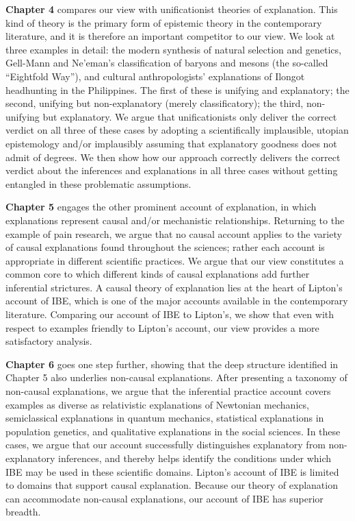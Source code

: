 \documentclass{article}[11pt]
\begin{document}
\textbf{Chapter 4} compares our view with unificationist theories of explanation.  This kind of theory is the primary form of epistemic theory in the contemporary literature, and it is therefore an important competitor to our view.  We look at three examples in detail: the modern synthesis of natural selection and genetics, Gell-Mann and Ne'eman's classification of baryons and mesons (the so-called ``Eightfold Way''), and cultural anthropologists' explanations of Ilongot headhunting in the Philippines. The first of these is unifying and explanatory; the second, unifying but non-explanatory (merely classificatory); the third, non-unifying but explanatory. We argue that unificationists only deliver the correct verdict on all three of these cases by adopting a scientifically implausible, utopian epistemology and/or implausibly assuming that explanatory goodness does not admit of degrees. We then show how our approach correctly delivers the correct verdict about the inferences and explanations in all three cases without getting entangled in these problematic assumptions. 

\textbf{Chapter 5} engages the other prominent account of explanation, in which explanations represent causal and/or mechanistic relationships.  Returning to the example of pain research, we argue that no causal account applies to the variety of causal explanations found throughout the sciences; rather each account is appropriate in different scientific practices. We argue that our view constitutes a common core to which different kinds of causal explanations add further inferential strictures.  A causal theory of explanation lies at the heart of Lipton's \parencite*{Lipton2004} account of IBE, which is one of the major accounts available in the contemporary literature.  Comparing our account of IBE to Lipton's, we show that even with respect to examples friendly to Lipton's account, our view provides a more satisfactory analysis.

\textbf{Chapter 6} goes one step further, showing that the deep structure identified in Chapter 5 also underlies non-causal explanations. After presenting a taxonomy of non-causal explanations, we argue that the inferential practice account covers examples as diverse as relativistic explanations of Newtonian mechanics, semiclassical explanations in quantum mechanics, statistical explanations in population genetics, and qualitative explanations in the social sciences.   In these cases, we argue that our account successfully distinguishes explanatory from non-explanatory inferences, and thereby helps identify the conditions under which IBE may be used in these scientific domains.   Lipton's account of IBE is limited to domains that support causal explanation.  Because our theory of explanation can accommodate non-causal explanations,  our account of IBE has superior breadth.
\end{document}
